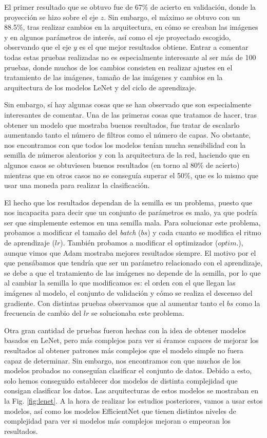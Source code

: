 \documentclass[a4paper,12pt,oneside,titlepage]{book}
\begin{document}
El primer resultado que se obtuvo fue de 67\% de acierto en validación, donde la proyección se hizo sobre el eje $z$. Sin embargo, el máximo se obtuvo con un 88.5\%, tras realizar cambios en la arquitectura, en cómo se creaban las imágenes y en algunos parámetros de interés, así como el eje proyectado escogido, observando que el eje $y$ es el que mejor resultados obtiene. Entrar a comentar todas estas pruebas realizadas no es especialmente interesante al ser más de 100 pruebas, donde muchos de los cambios consisten en realizar ajustes en el tratamiento de las imágenes, tamaño de las imágenes y cambios en la arquitectura de los modelos LeNet y del ciclo de aprendizaje.
 
Sin embargo, sí hay algunas cosas que se han observado que son especialmente interesantes de comentar. Una de las primeras cosas que tratamos de hacer, tras obtener un modelo que mostraba buenos resultados, fue tratar de escalarlo aumentando tanto el número de filtros como el número de capas. No obstante, nos encontramos con que todos los modelos tenían mucha sensibilidad con la semilla de números aleatorios y con la arquitectura de la red, haciendo que en algunos casos se obtuviesen buenos resultados (en torno al $80\%$ de acierto) mientras que en otros casos no se conseguía superar el 50\%, que es lo mismo que usar una moneda para realizar la clasificación.
 
El hecho que los resultados dependan de la semilla es un problema, puesto que nos incapacita para decir que un conjunto de parámetros es malo, ya que podría ser que simplemente estemos en una semilla mala. Para solucionar este problema, probamos a modificar el tamaño del \textit{batch} ($bs$) y cada cuanto se modifica el ritmo de aprendizaje ($lr$). También probamos a modificar el optimizador ($optim.$), aunque vimos que Adam mostraba mejores resultados siempre. El motivo por el que pensábamos que tendría que ser un parámetro relacionado con el aprendizaje, se debe a que el tratamiento de las imágenes no depende de la semilla, por lo que al cambiar la semilla lo que modificamos es: el orden con el que llegan las imágenes al modelo, el conjunto de validación y cómo se realiza el descenso del gradiente. Con distintas pruebas observamos que al aumentar tanto el $bs$ como la frecuencia de cambio del $lr$ se solucionaba este problema.
 
Otra gran cantidad de pruebas fueron hechas con la idea de obtener modelos basados en LeNet, pero más complejos para ver si éramos capaces de mejorar los resultados al obtener patrones más complejos que el modelo simple no fuera capaz de determinar. Sin embargo, nos encontramos con que muchos de los modelos probados no conseguían clasificar el conjunto de datos. Debido a esto, solo hemos conseguido establecer dos modelos de distinta complejidad que consigan clasificar los datos. Las arquitecturas de estos modelos se mostraban en la Fig. \ref{fig:lenet}. A la hora de realizar los estudios posteriores, vamos a usar estos modelos, así como los modelos EfficientNet que tienen distintos niveles de complejidad para ver si modelos más complejos mejoran o empeoran los resultados.
 
\end{document}

